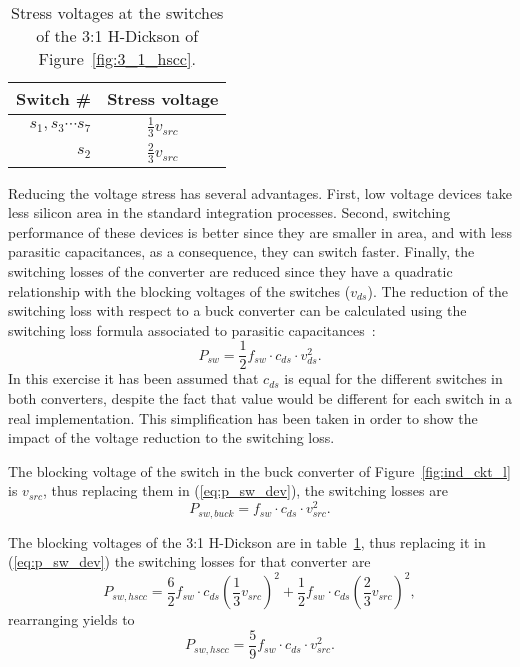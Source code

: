 \begin{table}[h]
\centering
\caption{Stress voltages at the switches of the 3:1 H-Dickson of Figure~\ref{fig:3_1_hscc}.}
\label{tab:3:1 H-Dick_V_stress}
\renewcommand{\arraystretch}{1.5}%
\begin{tabular}{r  c}
 Switch \# & Stress voltage  \\
 \midrule
 $s_1,s_3 \cdots s_7$ & $\frac{1}{3} v_{src}$ \\
 $s_2$ & $\frac{2 }{3} v_{src}$
\end{tabular}
\end{table}

Reducing the voltage stress has several advantages. First, low voltage devices take less silicon area in the standard integration processes. Second, switching performance of these devices is better since they are smaller in area, and with less parasitic capacitances, as a consequence, they can switch faster. Finally, the switching losses of the converter are reduced since they have a quadratic relationship with the blocking voltages of the switches ($v_{ds}$). The reduction of the switching loss with respect to a buck converter can be calculated using the switching loss formula associated to parasitic  capacitances~\cite{2001Erickson}:
\begin{equation}
P_{sw} = \frac{1}{2} f_{sw} \cdot c_{ds} \cdot v_{ds}^2.
\label{eq:p_sw_dev}
\end{equation}
In this exercise it has been assumed that $c_{ds}$ is equal for the different switches in both converters, despite the fact that value would be different for each switch in a real implementation. This simplification has been taken in order to show the impact of the voltage reduction to the switching loss. %

The blocking voltage of the switch in the buck converter of Figure~\ref{fig:ind_ckt_l} is $v_{src}$, thus replacing them in (\ref{eq:p_sw_dev}), the switching losses are
\begin{equation}
P_{sw,buck} =   f_{sw} \cdot c_{ds} \cdot v_{src}^2.
\label{eq:p_sw_buck}
\end{equation}

The blocking voltages of the 3:1 H-Dickson are in table~\ref{tab:3:1 H-Dick_V_stress}, thus replacing it in (\ref{eq:p_sw_dev}) the switching losses for that converter are
\begin{equation}
P_{sw,hscc} =  \frac{6}{2}  f_{sw} \cdot c_{ds} \left( \frac{1}{3} v_{src} \right)^2 + \frac{1}{2}  f_{sw} \cdot c_{ds} \left( \frac{2}{3} v_{src} \right)^2 ,
\label{eq:p_sw_hscc}
\end{equation}
rearranging yields to
\begin{equation}
P_{sw,hscc} =  \frac{5}{9}  f_{sw} \cdot c_{ds} \cdot v_{src}^2.
\label{eq:p_sw_hscc_sol}
\end{equation}

